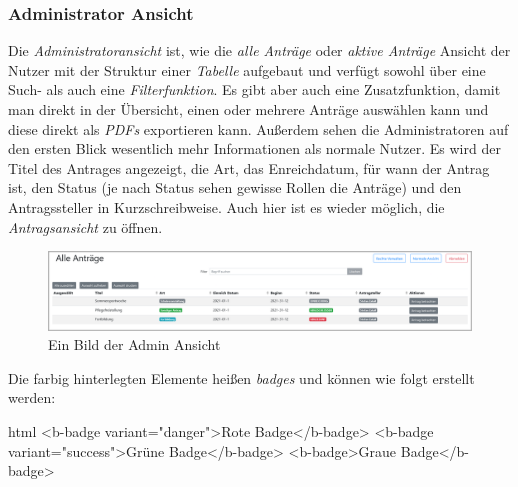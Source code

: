 \subsubsection{Administrator Ansicht}
\label{chapter:implementierung-frontend-komponenten-admin}
Die \textit{Administratoransicht} ist, wie die \textit{alle Anträge} oder \textit{aktive Anträge} Ansicht der Nutzer mit der Struktur einer \textit{Tabelle} aufgebaut und verfügt sowohl über eine Such- als auch eine \textit{Filterfunktion}. Es gibt aber auch eine Zusatzfunktion, damit man direkt in der Übersicht, einen oder mehrere Anträge auswählen kann und diese direkt als \textit{PDFs} exportieren kann. Außerdem sehen die Administratoren auf den ersten Blick wesentlich mehr Informationen als normale Nutzer. Es wird der Titel des Antrages angezeigt, die Art, das Enreichdatum, für wann der Antrag ist, den Status (je nach Status sehen gewisse Rollen die Anträge) und den Antragssteller in Kurzschreibweise. Auch hier ist es wieder möglich, die \textit{Antragsansicht} zu öffnen.
\begin{figure}[H]
	\centering
	\includegraphics[width=1\linewidth]{images/ldehner_implementierung/admin}
	\caption[Administrator Ansicht]{Ein Bild der Admin Ansicht}
	\label{fig:adminview}
\end{figure}
Die farbig hinterlegten Elemente heißen \textit{badges} und können wie folgt erstellt werden:
\begin{code}{html}
	<b-badge variant="danger">Rote Badge</b-badge>
	<b-badge variant="success">Grüne Badge</b-badge>
	<b-badge>Graue Badge</b-badge>
\end{code}
	\label{list:badgebsp} ~\\
~\\

\newpage
